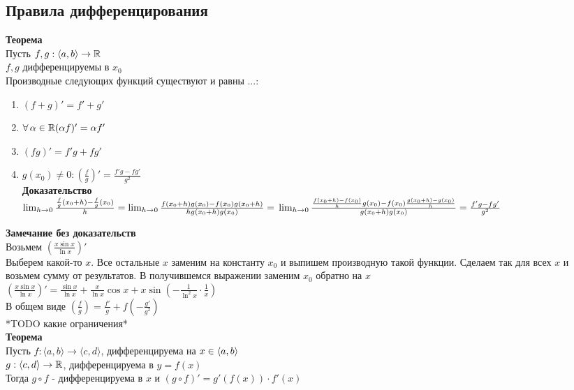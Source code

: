 \documentclass[12pt]{article}
\begin{document}
\subsection{Правила дифференцирования}
\textbf{Теорема}\\
Пусть  $f,g: \langle a, b \rangle \rightarrow \mathbb{R}$\\
$f,g$ дифференцируемы в $x_0$\\
Производные следующих функций существуют и равны ...:
\begin{enumerate}
    \item $(f+g)' = f' + g'$
    \item $\forall\,\alpha \in \mathbb{R} (\alpha f)' = \alpha f'$
    \item $(fg)' = f'g+fg'$
    \item $g(x_0) \neq 0: \left(\frac fg \right)' = \frac{f'g-fg'}{g^2}$\\
    \textbf{Доказательство}\\
    $\lim_{h\rightarrow 0} \frac{\frac fg (x_0+h) - \frac fg (x_0)}h = \lim_{h \rightarrow 0} \frac{f(x_0+h)g(x_0)-f(x_0)g(x_0+h)}{hg(x_0+h)g(x_0)} = \\\lim_{h \rightarrow 0} \frac{\frac{f(x_0+h)-f(x_0)}hg(x_0) - f(x_0)\frac{g(x_0+h)-g(x_0)}{h}}{g(x_0+h)g(x_0)} = \frac{f'g-fg'}{g^2}$
\end{enumerate}
\textbf{Замечание без доказательств}\\
Возьмем $\left( \frac{x\sin x}{\ln x}\right)'$\\
Выберем какой-то $x$. Все остальные $x$ заменим на константу $x_0$ и выпишем производную такой функции. Сделаем так для всех $x$ и возьмем сумму от результатов. В получившемся выражении заменим $x_0$ обратно на $x$\\
$\left( \frac{x\sin x}{\ln x}\right)' = \frac{\sin x}{\ln x} + \frac{x}{\ln x}\cos x + x\sin\left(-\frac{1}{\ln^2 x} \cdot \frac 1x\right)$\\
В общем виде $\left(\frac{f}{g}\right) = \frac{f'}{g} + f\left(-\frac{g'}{g^2}\right)$\\
*TODO какие ограничения*\\
\textbf{Теорема}\\
Пусть $f: \langle a, b \rangle \rightarrow \langle c, d \rangle$, дифференцируема на $x \in \langle a, b \rangle$\\
$g: \langle c, d \rangle \rightarrow \mathbb{R}$, дифференцируема в $y = f(x)$\\
Тогда $g\circ f$ - дифференцируема в $x$ и $(g \circ f)' = g'(f(x))\cdot f'(x)$\\
\end{document}
